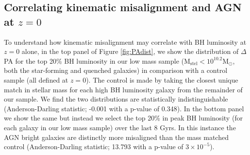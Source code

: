 \subsection{Correlating kinematic misalignment and AGN at $z=0$}
To understand how kinematic misalignment may correlate with BH luminosity at $z=0$ alone, in the top panel of Figure \ref{fig:PAdist}, we show the distribution of $\Delta$PA for the top 20\% BH luminosity in our low mass sample ($\mathrm{M_{stel} < 10^{10.2}M_{\odot}}$, both the star-forming and quenched galaxies) in comparison with a control sample (all defined at $z=0$). The control is made by taking the closest unique match in stellar mass for each high BH luminosity galaxy from the remainder of our sample. We find the two distributions are statistically indistinguishable (Anderson-Darling statistic; -0.001 with a p-value of 0.348). In the bottom panel we show the same but instead we select the top 20\% in peak BH luminosity (for each galaxy in our low mass sample) over the last 8 Gyrs. In this instance the AGN bright galaxies are distinctly more misaligned than the mass matched control (Anderson-Darling statistic; 13.793 with a p-value of $3 \times 10^{-5}$). 

